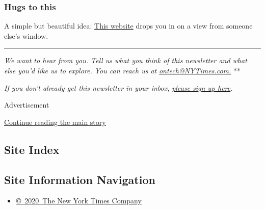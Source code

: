 \hypertarget{hugs-to-this}{%
\subsubsection{Hugs to this}\label{hugs-to-this}}

A simple but beautiful idea: \href{https://window-swap.com}{This
website} drops you in on a view from someone else's window.

\begin{center}\rule{0.5\linewidth}{\linethickness}\end{center}

\emph{We want to hear from you. Tell us what you think of this
newsletter and what else you'd like us to explore. You can reach us at}
\href{mailto:ontech@NYTimes.com?subject=On\%20Tech\%20Feedback}{\emph{ontech@NYTimes.com.}}
**

\emph{If you don't already get this newsletter in your inbox,}
\href{https://www.nytimes3xbfgragh.onion/newsletters/signup/OT}{\emph{please
sign up here}}\emph{.}

Advertisement

\protect\hyperlink{after-bottom}{Continue reading the main story}

\hypertarget{site-index}{%
\subsection{Site Index}\label{site-index}}

\hypertarget{site-information-navigation}{%
\subsection{Site Information
Navigation}\label{site-information-navigation}}

\begin{itemize}
\tightlist
\item
  \href{https://help.nytimes3xbfgragh.onion/hc/en-us/articles/115014792127-Copyright-notice}{©~2020~The
  New York Times Company}
\end{itemize}

